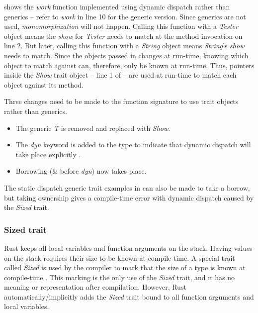  shows the \textit{work} function implemented using dynamic dispatch rather than generics -- refer to \textit{work} in  line 10 for the generic version.
Since generics are not used, \textit{monomorphization} will not happen.
Calling this function with a \textit{Tester} object means the \textit{show} for \textit{Tester} needs to match at the method invocation on line 2.
But later, calling this function with a \textit{String} object means \textit{String}'s \textit{show} needs to match.
Since the objects passed in changes at run-time, knowing which object to match against can, therefore, only be known at run-time.
Thus, pointers inside the \textit{Show} trait object -- line 1 of  -- are used at run-time to match each object against its method.


Three changes need to be made to the function signature to use trait objects rather than generics.
\begin{itemize}
	\item The generic \textit{T} is removed and replaced with \textit{Show}.
	\item The \textit{dyn} keyword is added to the type to indicate that dynamic dispatch will take place explicitly \cite{klabnik_2019_01}.
	\item Borrowing (\& before \textit{dyn}) now takes place.
\end{itemize}

The static dispatch generic trait examples in  can also be made to take a borrow, but taking ownership gives a compile-time error with dynamic dispatch caused by the \textit{Sized} trait.

\subsubsection{Sized trait}
Rust keeps all local variables and function arguments on the stack.
Having values on the stack requires their size to be known at compile-time.
A special trait called \textit{Sized} is used by the compiler to mark that the size of a type is known at compile-time \cite{klabnik_2019_01}.
This marking is the only use of the \textit{Sized} trait, and it has no meaning or representation after compilation.
However, Rust automatically/implicitly adds the \textit{Sized} trait bound to all function arguments and local variables.

